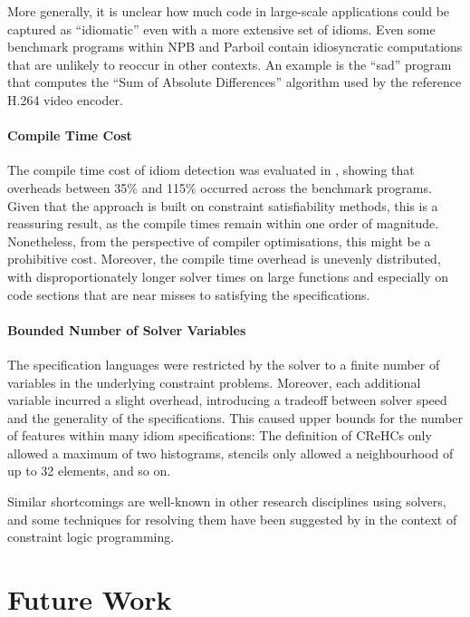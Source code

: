     More generally, it is unclear how much code in large-scale applications
    could be captured as ``idiomatic'' even with a more extensive set of idioms.
    Even some benchmark programs within NPB and Parboil contain idiosyncratic
    computations that are unlikely to reoccur in other contexts.
    An example is the ``sad'' program that computes the
    ``Sum of Absolute Differences'' algorithm used by the reference H.264 video
    encoder.

\paragraph*{Compile Time Cost}

    The compile time cost of idiom detection was evaluated in
    , showing that overheads between 35$\%$ and 115$\%$
    occurred across the benchmark programs.
    Given that the approach is built on constraint satisfiability methods, this
    is a reassuring result, as the compile times remain within one order of
    magnitude.
    Nonetheless, from the perspective of compiler optimisations, this might be
    a prohibitive cost.
    Moreover, the compile time overhead is unevenly distributed, with
    disproportionately longer solver times on large functions and especially on
    code sections that are near misses to satisfying the specifications.

    \paragraph*{Bounded Number of Solver Variables}
    The specification languages were restricted by the solver to a finite number
    of variables in the underlying constraint problems.
    Moreover, each additional variable incurred a slight overhead, introducing
    a tradeoff between solver speed and the generality of the specifications.
    This caused upper bounds for the number of features within many idiom
    specifications:
    The definition of CReHCs only allowed a maximum of two histograms, stencils
    only allowed a neighbourhood of up to 32 elements, and so on.

    Similar shortcomings are well-known in other research disciplines using
    solvers, and some techniques for resolving them have been suggested by
    \citet{Krings2016Constraint} in the context of constraint logic programming.

\section{Future Work}

